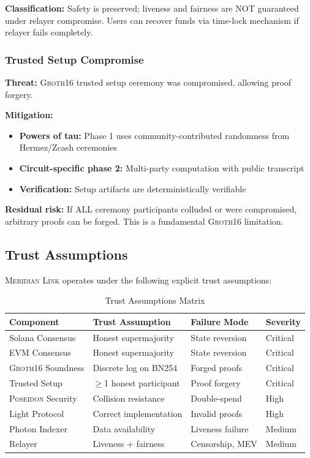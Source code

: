 \documentclass[11pt,a4paper,twoside]{article}
\newcommand{\protocol}{\textsc{Meridian Link}}
\newcommand{\poseidon}{\textsc{Poseidon}}
\newcommand{\groth}{\textsc{Groth16}}
\begin{document}
\textbf{Classification:} Safety is preserved; liveness and fairness are NOT guaranteed under relayer compromise. Users can recover funds via time-lock mechanism if relayer fails completely.

\subsubsection{Trusted Setup Compromise}

\textbf{Threat:} \groth{} trusted setup ceremony was compromised, allowing proof forgery.

\textbf{Mitigation:}
\begin{itemize}
    \item \textbf{Powers of tau:} Phase 1 uses community-contributed randomness from Hermez/Zcash ceremonies
    \item \textbf{Circuit-specific phase 2:} Multi-party computation with public transcript
    \item \textbf{Verification:} Setup artifacts are deterministically verifiable
\end{itemize}

\textbf{Residual risk:} If ALL ceremony participants colluded or were compromised, arbitrary proofs can be forged. This is a fundamental \groth{} limitation.

\subsection{Trust Assumptions}

\protocol{} operates under the following explicit trust assumptions:

\begin{table}[H]
\centering
\caption{Trust Assumptions Matrix}
\label{tab:trust}
\small
\begin{tabular}{@{}llll@{}}
\toprule
\textbf{Component} & \textbf{Trust Assumption} & \textbf{Failure Mode} & \textbf{Severity} \\
\midrule
Solana Consensus & Honest supermajority & State reversion & Critical \\
EVM Consensus & Honest supermajority & State reversion & Critical \\
\groth{} Soundness & Discrete log on BN254 & Forged proofs & Critical \\
Trusted Setup & $\geq$1 honest participant & Proof forgery & Critical \\
\poseidon{} Security & Collision resistance & Double-spend & High \\
Light Protocol & Correct implementation & Invalid proofs & High \\
Photon Indexer & Data availability & Liveness failure & Medium \\
Relayer & Liveness + fairness & Censorship, MEV & Medium \\
\bottomrule
\end{tabular}
\end{table}
\end{document}
